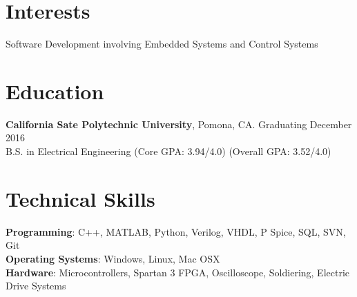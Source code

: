 \documentclass[margin,line]{res}
\begin{document}

\begin{resume}

\section{\sc Interests}
Software Development involving Embedded Systems and Control Systems

\section{\sc Education}
{\bf California Sate Polytechnic University}, Pomona, CA.  \hfill Graduating December 2016\\
B.S. in Electrical Engineering \hfill(Core GPA: 3.94/4.0) (Overall GPA: 3.52/4.0)

\section{\sc Technical Skills}
{\bf Programming}:  C++, MATLAB, Python, Verilog, VHDL, P Spice, SQL, SVN, Git\\
{\bf Operating Systems}: Windows, Linux, Mac OSX\\
{\bf Hardware}: Microcontrollers, Spartan 3 FPGA, Oscilloscope, Soldiering, Electric Drive Systems



\end{resume}
\end{document}
